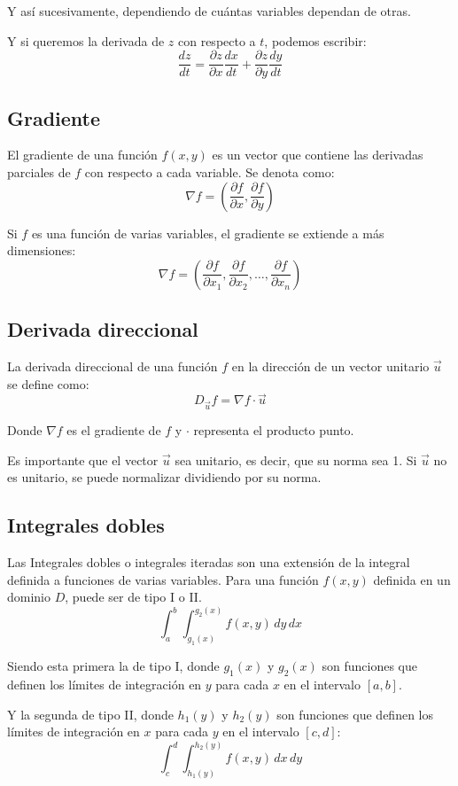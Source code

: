 Y así sucesivamente, dependiendo de cuántas variables dependan de otras.

Y si queremos la derivada de \(z\) con respecto a \(t\), podemos escribir:
\[
\frac{dz}{dt} = \frac{\partial z}{\partial x} \frac{dx}{dt} + \frac{\partial z}{\partial y} \frac{dy}{dt}
\]

\subsection{Gradiente}
El gradiente de una función \(f(x, y)\) es un vector que contiene las derivadas parciales de \(f\) con respecto a cada variable. Se denota como:
\[
\nabla f = \left( \frac{\partial f}{\partial x}, \frac{\partial f}{\partial y} \right)
\]

Si \(f\) es una función de varias variables, el gradiente se extiende a más dimensiones:
\[
\nabla f = \left( \frac{\partial f}{\partial x_1}, \frac{\partial f}{\partial x_2}, \ldots, \frac{\partial f}{\partial x_n} \right)
\]

\subsection{Derivada direccional}
La derivada direccional de una función \(f\) en la dirección de un vector unitario \(\vec{u}\) se define como:
\[
D_{\vec{u}} f = \nabla f \cdot \vec{u}
\]

Donde \(\nabla f\) es el gradiente de \(f\) y \(\cdot\) representa el producto punto.

Es importante que el vector \(\vec{u}\) sea unitario, es decir, que su norma sea 1. 
Si \(\vec{u}\) no es unitario, se puede normalizar dividiendo por su norma.

\subsection{Integrales dobles}
Las Integrales dobles o integrales iteradas son una extensión de la integral definida a funciones de varias variables.
Para una función \(f(x, y)\) definida en un dominio \(D\), puede ser de tipo I o II.\ 
\[
\int_a^b \int_{g_1(x)}^{g_2(x)} f(x,y)\,dy\,dx
\]

Siendo esta primera la de tipo I, donde \(g_1(x)\) y \(g_2(x)\) son funciones que definen los límites de integración en \(y\) para cada \(x\) en el intervalo \([a, b]\).

Y la segunda de tipo II, donde \(h_1(y)\) y \(h_2(y)\) son funciones que definen los límites de integración en \(x\) para cada \(y\) en el intervalo \([c, d]\):
\[
\int_c^d \int_{h_1(y)}^{h_2(y)} f(x,y)\,dx\,dy
\]

